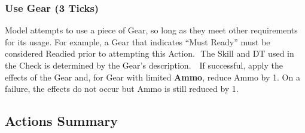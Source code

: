 \documentclass[
]{book}
\begin{document}
\hypertarget{use-gear-3-ticks}{%
\subsubsection*{Use Gear (3 Ticks)}\label{use-gear-3-ticks}}

Model attempts to use a piece of Gear, so long as they meet other requirements for its usage. For example, a Gear that indicates ``Must Ready'' must be considered Readied prior to attempting this Action.  The Skill and DT used in the Check is determined by the Gear's description.   If successful, apply the effects of the Gear and, for Gear with limited \textbf{Ammo}, reduce Ammo by 1. On a failure, the effects do not occur but Ammo is still reduced by 1.

\hypertarget{actsum}{%
\subsection*{Actions Summary}\label{actsum}}
\end{document}
